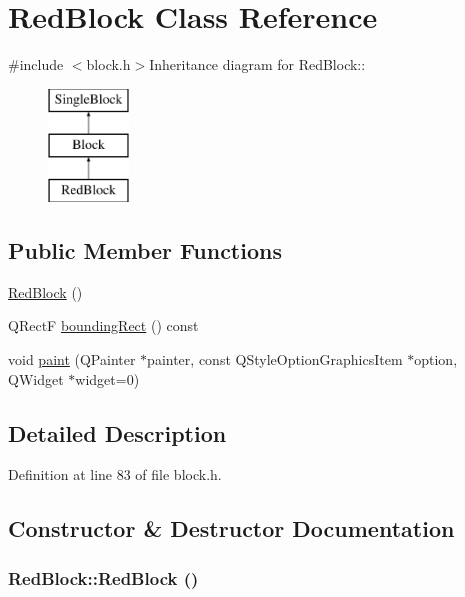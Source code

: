 \hypertarget{class_red_block}{
\section{RedBlock Class Reference}
\label{class_red_block}
}


{\ttfamily \#include $<$block.h$>$}Inheritance diagram for RedBlock::\begin{figure}[H]
\begin{center}
\leavevmode
\includegraphics[height=3cm]{class_red_block}
\end{center}
\end{figure}
\subsection*{Public Member Functions}
\begin{DoxyCompactItemize}
\item 
\hyperlink{class_red_block_a48950c740ef6ce1abcaf231a388419e3}{RedBlock} ()
\item 
QRectF \hyperlink{class_red_block_a31036897a1451c6140ce9f368e461fb0}{boundingRect} () const 
\item 
void \hyperlink{class_red_block_a78013615dbc11158d47eb38cc3d416cd}{paint} (QPainter $\ast$painter, const QStyleOptionGraphicsItem $\ast$option, QWidget $\ast$widget=0)
\end{DoxyCompactItemize}


\subsection{Detailed Description}


Definition at line 83 of file block.h.

\subsection{Constructor \& Destructor Documentation}
\hypertarget{class_red_block_a48950c740ef6ce1abcaf231a388419e3}{
\subsubsection[{RedBlock}]{\setlength{\rightskip}{0pt plus 5cm}RedBlock::RedBlock ()}}
\label{class_red_block_a48950c740ef6ce1abcaf231a388419e3}


